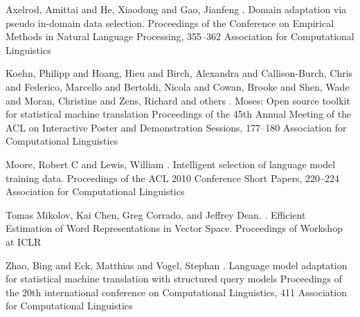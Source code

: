 \documentclass[11pt]{article}
\begin{document}
\begin{thebibliography}{}

Axelrod, Amittai and He, Xiaodong and Gao, Jianfeng
.
\newblock Domain adaptation via pseudo in-domain data selection.
\newblock Proceedings of the Conference on Empirical Methods in Natural Language Processing, 
355--362
\newblock
Association for Computational Linguistics

Koehn, Philipp and Hoang, Hieu and Birch, Alexandra and Callison-Burch, Chris and Federico, Marcello and Bertoldi, Nicola and Cowan, Brooke and Shen, Wade and Moran, Christine and Zens, Richard and others
.
\newblock Moses: Open source toolkit for statistical machine translation
\newblock Proceedings of the 45th Annual Meeting of the ACL on Interactive Poster and Demonstration Sessions,
177--180
\newblock
Association for Computational Linguistics
	
Moore, Robert C and Lewis, William
.
\newblock Intelligent selection of language model training data.
\newblock Proceedings of the ACL 2010 Conference Short Papers, 
220--224
\newblock
Association for Computational Linguistics

Tomas Mikolov, Kai Chen, Greg Corrado, and Jeffrey Dean.
.
\newblock Efficient Estimation of Word Representations in Vector Space.
\newblock Proceedings of Workshop at ICLR

Zhao, Bing and Eck, Matthias and Vogel, Stephan
.
\newblock Language model adaptation for statistical machine translation with structured query models
\newblock Proceedings of the 20th international conference on Computational Linguistics, 
411
\newblock
Association for Computational Linguistics








\end{thebibliography}
\end{document}
